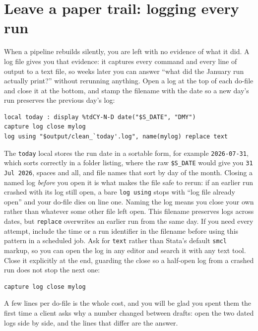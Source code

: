 \documentclass[
    a4paper,
    fontsize=10pt,
    twoside=true,
    numbers=noenddot,
]{kaobook}
\begin{document}
\section{Leave a paper trail: logging every run}\label{sec:logging}
When a pipeline rebuilds silently, you are left with no evidence of what it did. A log file gives you that evidence: it captures every command and every line of output to a text file, so weeks later you can answer \enquote{what did the January run actually print?} without rerunning anything. Open a log at the top of each do-file and close it at the bottom, and stamp the filename with the date so a new day's run preserves the previous day's log:
\par
{\footnotesize
\begin{verbatim}
local today : display %tdCY-N-D date("$S_DATE", "DMY")
capture log close mylog
log using "$output/clean_`today'.log", name(mylog) replace text
\end{verbatim}
}
The \texttt{today} local stores the run date in a sortable form, for example \texttt{2026-07-31}, which sorts correctly in a folder listing, where the raw \texttt{\$S\_DATE} would give you \texttt{31 Jul 2026}, spaces and all, and file names that sort by day of the month. Closing a named log \emph{before} you open it is what makes the file safe to rerun: if an earlier run crashed with its log still open, a bare \texttt{log using} stops with \enquote{log file already open} and your do-file dies on line one. Naming the log means you close your own rather than whatever some other file left open. This filename preserves logs across dates, but \texttt{replace} overwrites an earlier run from the same day. If you need every attempt, include the time or a run identifier in the filename before using this pattern in a scheduled job. Ask for \texttt{text} rather than Stata's default \texttt{smcl} markup, so you can open the log in any editor and search it with any text tool. Close it explicitly at the end, guarding the close so a half-open log from a crashed run does not stop the next one:
\par
{\footnotesize
\begin{verbatim}
capture log close mylog
\end{verbatim}
}
A few lines per do-file is the whole cost, and you will be glad you spent them the first time a client asks why a number changed between drafts: open the two dated logs side by side, and the lines that differ are the answer.
\end{document}
